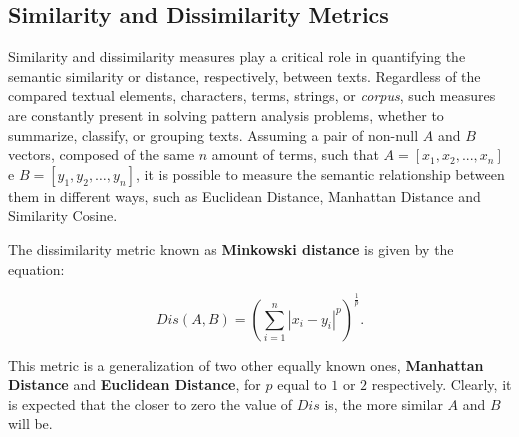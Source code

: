 \documentclass{ieeeaccess}
\begin{document}
\subsection{Similarity and Dissimilarity Metrics}
\label{subsec:similaridade}

Similarity and dissimilarity measures play a critical role in quantifying the semantic similarity or distance, respectively, between texts. Regardless of the compared textual elements, characters, terms, strings, or \textit{corpus}, such measures are constantly present in solving pattern analysis problems, whether to summarize, classify, or grouping texts. Assuming a pair of non-null $ A $ and $ B $ vectors, composed of the same $ n $ amount of terms, such that $ A = [x_ {1}, x_ {2}, ..., x_ {n} ] $ e $ B = [y_ {1}, y_ {2}, \ldots, y_ {n}] $, it is possible to measure the semantic relationship between them in different ways, such as Euclidean Distance, Manhattan Distance and Similarity Cosine.



The dissimilarity metric known as \textbf{Minkowski distance} is given by the equation:

\begin{equation} 
Dis (A,B) =\left ( \sum_{i=1}^{n} \left |x_{i}-y_{i}\right|^{p}\right )^{\frac{1}{p}}.
\label{eq:minkowski}
\end{equation}

\noindent This metric is a generalization of two other equally known ones, \textbf{Manhattan Distance} and \textbf{Euclidean Distance}, for $ p $ equal to $ 1 $ or $ 2 $ respectively. Clearly, it is expected that the closer to zero the value of $ Dis $ is, the more similar $ A $ and $ B $ will be.
\end{document}
